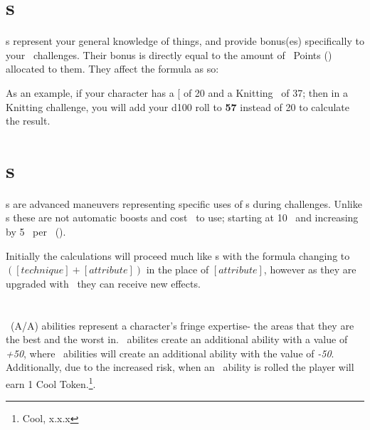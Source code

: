 \section{\skill s}

\skill s represent your general knowledge of things, and provide bonus(es) specifically to your \KNOW\ challenges. Their bonus is directly equal to the amount of \skill\ Points (\skillval) allocated to them. They affect the formula as so:


As an example, if your character has a {[}\KNOW{]} of 20 and a Knitting \skill\ of 37; then in a Knitting challenge, you will add your d100 roll to \textbf{57} instead of 20 to calculate the result.


\section{\techn s\index{\techn}}

\techn s are advanced maneuvers representing specific uses of \attribute s during challenges. Unlike \skill s these are not automatic boosts and cost \ENful\ to use; starting at 10 \EN\ and increasing by 5 \EN\ per \advancement\ (\advanmini). 

Initially the calculations will proceed much like \skill s with the formula changing to $([technique]+[attribute])$ in the place of $[attribute]$, however as they are upgraded with \advanmini\ they can receive new effects.


\section{\AWEAWF{}}

\AWEAWF\ (A/A) abilities represent a character's fringe expertise- the areas that they are the best and the worst in. \AWE\ abilites create an additional ability with a value of \emph{+50}, where \AWF\ abilities will create an additional ability with the value of \emph{-50}. Additionally, due to the increased risk, when an \AWF\ ability is rolled the player will earn 1 Cool Token.\footnote{Cool, x.x.x}. 

